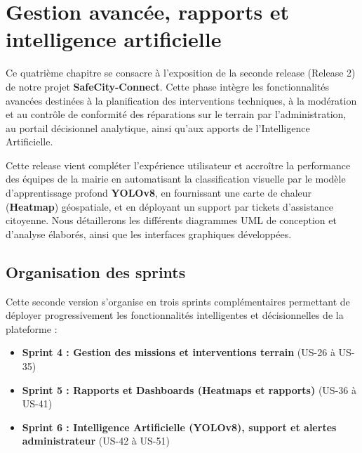 
\chapter{Gestion avancée, rapports et intelligence artificielle}

Ce quatrième chapitre se consacre à l'exposition de la seconde release (Release 2) de notre projet \textbf{SafeCity-Connect}. Cette phase intègre les fonctionnalités avancées destinées à la planification des interventions techniques, à la modération et au contrôle de conformité des réparations sur le terrain par l'administration, au portail décisionnel analytique, ainsi qu'aux apports de l'Intelligence Artificielle.

Cette release vient compléter l'expérience utilisateur et accroître la performance des équipes de la mairie en automatisant la classification visuelle par le modèle d'apprentissage profond \textbf{YOLOv8}, en fournissant une carte de chaleur (\textbf{Heatmap}) géospatiale, et en déployant un support par tickets d'assistance citoyenne. Nous détaillerons les différents diagrammes UML de conception et d'analyse élaborés, ainsi que les interfaces graphiques développées.

\section{Organisation des sprints}
Cette seconde version s'organise en trois sprints complémentaires permettant de déployer progressivement les fonctionnalités intelligentes et décisionnelles de la plateforme :
\begin{itemize}
    \item \textbf{Sprint 4 : Gestion des missions et interventions terrain} (US-26 à US-35)
    \item \textbf{Sprint 5 : Rapports et Dashboards (Heatmaps et rapports)} (US-36 à US-41)
    \item \textbf{Sprint 6 : Intelligence Artificielle (YOLOv8), support et alertes administrateur} (US-42 à US-51)
\end{itemize}


